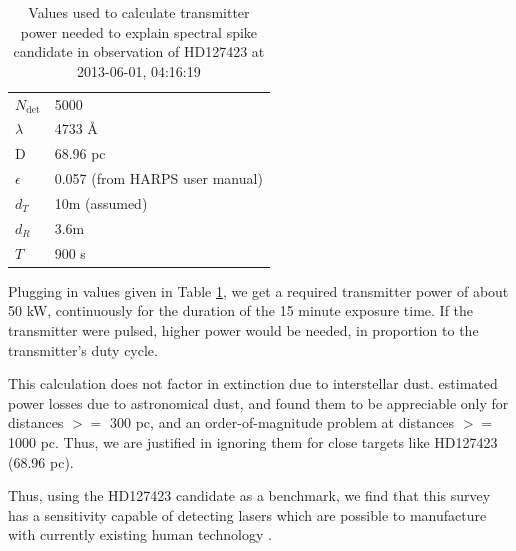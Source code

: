 \documentclass[twocolumn]{aastex701}
\begin{document}
\begin{table}[h]
\begin{tabular}{ll}
$N_{\mbox{det}}$ & 5000\\
$\lambda$ & 4733 \AA \\
D & 68.96 pc \\
$\epsilon$ & 0.057 (from HARPS user manual)\\
$d_T$ & 10m (assumed) \\
$d_R$ & 3.6m \\
$T$ & 900 s\\
\end{tabular}
\label{t:powervalues}
\caption{Values used to calculate transmitter power needed to explain spectral spike candidate in observation of HD127423 at 2013-06-01, 04:16:19}
\end{table}

Plugging in values given in Table \ref{t:powervalues}, we get a required transmitter power of about 50 kW, continuously for the duration of the 15 minute exposure time. If the transmitter were pulsed, higher power would be needed, in proportion to the transmitter's duty cycle. 

This calculation does not factor in extinction due to interstellar dust.  \cite{Hippke_2018} estimated power losses due to astronomical dust, and found them to be appreciable only for distances $>=$ 300 pc, and an order-of-magnitude problem at distances $>=$ 1000 pc.  Thus, we are justified in ignoring them for close targets like HD127423 (68.96 pc).

Thus, using the HD127423 candidate as a benchmark, we find that this survey has a sensitivity capable of detecting lasers which are possible to manufacture with currently existing human technology \citep{Lander1997ContinuouswaveCD}.
\end{document}
